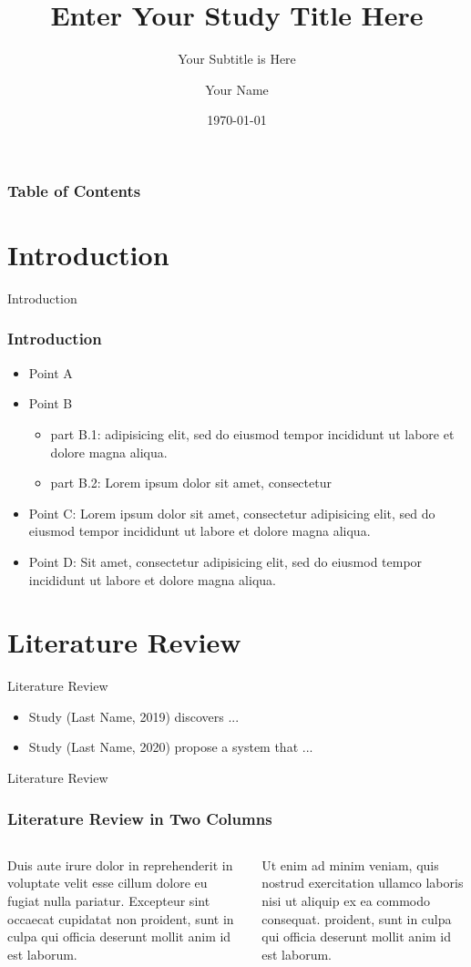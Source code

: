 \documentclass[10pt]{beamer}
\title[University of Wisconsin Milwaukee]{Enter Your Study Title Here}
\subtitle{ Your Subtitle is Here}
\author[Your Name]{Your Name}
\institute[]{University of Wisconsin Milwaukee}
\date[\textcolor{white}{\today} ]
{\today}
\begin{document}
\frame{\titlepage}
\begin{frame}
\frametitle{Table of Contents}
\tableofcontents
\end{frame}

\section{Introduction}
    \begin{frame}{Introduction}
    \frametitle{Introduction}
        \begin{itemize}
            \item Point A
            \item Point B
        \begin{itemize}
            \item part B.1: adipisicing elit, sed do eiusmod tempor incididunt ut labore et dolore magna aliqua.
            \item part B.2: Lorem ipsum dolor sit amet, consectetur 
        \end{itemize}
            \item Point C: Lorem ipsum dolor sit amet, consectetur adipisicing elit, sed do eiusmod tempor incididunt ut labore et dolore magna aliqua.
            \item Point D: Sit amet, consectetur adipisicing elit, sed do eiusmod tempor incididunt ut labore et dolore magna aliqua.
        \end{itemize}
    \end{frame}
\section{Literature Review}

\begin{frame}{Literature Review}
    
	
    \begin{itemize}
        \item  Study (Last Name, 2019) discovers ...
        \item  Study (Last Name, 2020) propose a system that ...
    \end{itemize}
\end{frame}

\begin{frame}{Literature Review}
    \frametitle{Literature Review in Two Columns}
    \begin{columns}
    
    Duis aute irure dolor in reprehenderit in voluptate velit esse cillum dolore eu fugiat nulla pariatur. Excepteur sint occaecat cupidatat non proident, sunt in culpa qui officia deserunt mollit anim id est laborum.
    
    Ut enim ad minim veniam, quis nostrud exercitation ullamco laboris nisi ut aliquip ex ea commodo consequat. proident, sunt in culpa qui officia deserunt mollit anim id est laborum.
    
    \end{columns}
\end{frame}
\end{document}
